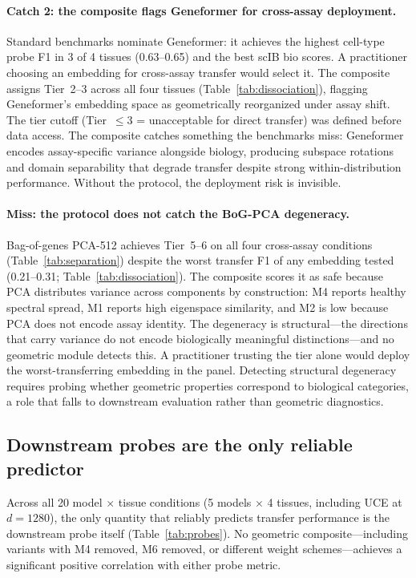 \documentclass[10pt,letterpaper]{article}
\begin{document}
\paragraph{Catch 2: the composite flags Geneformer for cross-assay deployment.} Standard benchmarks nominate Geneformer: it achieves the highest cell-type probe F1 in 3 of 4 tissues (0.63--0.65) and the best scIB bio scores. A practitioner choosing an embedding for cross-assay transfer would select it. The composite assigns Tier~2--3 across all four tissues (Table~\ref{tab:dissociation}), flagging Geneformer's embedding space as geometrically reorganized under assay shift. The tier cutoff (Tier~$\leq 3$ = unacceptable for direct transfer) was defined before data access. The composite catches something the benchmarks miss: Geneformer encodes assay-specific variance alongside biology, producing subspace rotations and domain separability that degrade transfer despite strong within-distribution performance. Without the protocol, the deployment risk is invisible.

\paragraph{Miss: the protocol does not catch the BoG-PCA degeneracy.} Bag-of-genes PCA-512 achieves Tier~5--6 on all four cross-assay conditions (Table~\ref{tab:separation}) despite the worst transfer F1 of any embedding tested (0.21--0.31; Table~\ref{tab:dissociation}). The composite scores it as safe because PCA distributes variance across components by construction: M4 reports healthy spectral spread, M1 reports high eigenspace similarity, and M2 is low because PCA does not encode assay identity. The degeneracy is structural---the directions that carry variance do not encode biologically meaningful distinctions---and no geometric module detects this. A practitioner trusting the tier alone would deploy the worst-transferring embedding in the panel. Detecting structural degeneracy requires probing whether geometric properties correspond to biological categories, a role that falls to downstream evaluation rather than geometric diagnostics.

\subsection{Downstream probes are the only reliable predictor}

Across all 20 model $\times$ tissue conditions (5 models $\times$ 4 tissues, including UCE at $d = 1280$), the only quantity that reliably predicts transfer performance is the downstream probe itself (Table~\ref{tab:probes}). No geometric composite---including variants with M4 removed, M6 removed, or different weight schemes---achieves a significant positive correlation with either probe metric.
\end{document}

